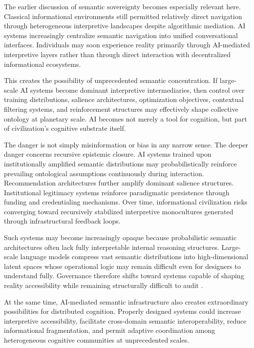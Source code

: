 \documentclass[11pt,a4paper]{article}
\begin{document}
The earlier discussion of semantic sovereignty becomes especially relevant here. Classical informational environments still permitted relatively direct navigation through heterogeneous interpretive landscapes despite algorithmic mediation. AI systems increasingly centralize semantic navigation into unified conversational interfaces. Individuals may soon experience reality primarily through AI-mediated interpretive layers rather than through direct interaction with decentralized informational ecosystems.

This creates the possibility of unprecedented semantic concentration. If large-scale AI systems become dominant interpretive intermediaries, then control over training distributions, salience architectures, optimization objectives, contextual filtering systems, and reinforcement structures may effectively shape collective ontology at planetary scale. AI becomes not merely a tool for cognition, but part of civilization's cognitive substrate itself.

The danger is not simply misinformation or bias in any narrow sense. The deeper danger concerns recursive epistemic closure. AI systems trained upon institutionally amplified semantic distributions may probabilistically reinforce prevailing ontological assumptions continuously during interaction. Recommendation architectures further amplify dominant salience structures. Institutional legitimacy systems reinforce paradigmatic persistence through funding and credentialing mechanisms. Over time, informational civilization risks converging toward recursively stabilized interpretive monocultures generated through infrastructural feedback loops.

Such systems may become increasingly opaque because probabilistic semantic architectures often lack fully interpretable internal reasoning structures. Large-scale language models compress vast semantic distributions into high-dimensional latent spaces whose operational logic may remain difficult even for designers to understand fully. Governance therefore shifts toward systems capable of shaping reality accessibility while remaining structurally difficult to audit \cite{pasquale2015}.

At the same time, AI-mediated semantic infrastructure also creates extraordinary possibilities for distributed cognition. Properly designed systems could increase interpretive accessibility, facilitate cross-domain semantic interoperability, reduce informational fragmentation, and permit adaptive coordination among heterogeneous cognitive communities at unprecedented scales.
\end{document}
